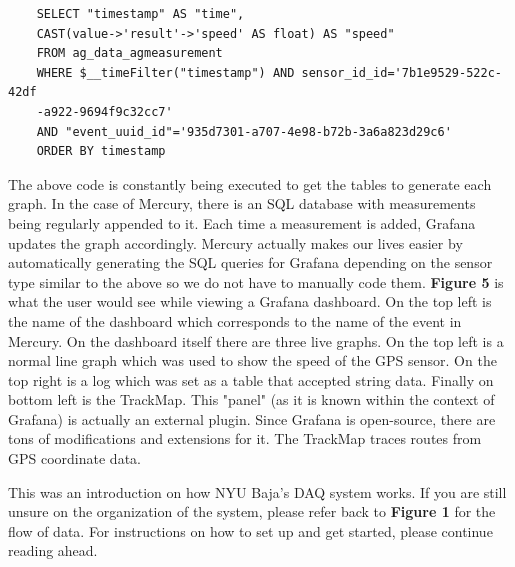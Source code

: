 \documentclass[12pt, letterpaper]{article}
\begin{document}
\begin{verbatim}
    SELECT "timestamp" AS "time",
    CAST(value->'result'->'speed' AS float) AS "speed"
    FROM ag_data_agmeasurement
    WHERE $__timeFilter("timestamp") AND sensor_id_id='7b1e9529-522c-42df
    -a922-9694f9c32cc7'
    AND "event_uuid_id"='935d7301-a707-4e98-b72b-3a6a823d29c6'
    ORDER BY timestamp
\end{verbatim}
	
	 The above code is constantly being executed to get the tables to generate each graph. In the case of Mercury, there is an SQL database with measurements being regularly appended to it. Each time a measurement is added, Grafana updates the graph accordingly. Mercury actually makes our lives easier by automatically generating the SQL queries for Grafana depending on the sensor type similar to the above so we do not have to manually code them. \textbf{Figure 5} is what the user would see while viewing a Grafana dashboard. On the top left is the name of the dashboard which corresponds to the name of the event in Mercury. On the dashboard itself there are three live graphs. On the top left is a normal line graph which was used to show the speed of the GPS sensor. On the top right is a log which was set as a table that accepted string data. Finally on bottom left is the TrackMap. This "panel" (as it is known within the context of Grafana) is actually an external plugin. Since Grafana is open-source, there are tons of modifications and extensions for it. The TrackMap traces routes from GPS coordinate data.
	 
\par This was an introduction on how NYU Baja's DAQ system works. If you are still unsure on the organization of the system, please refer back to \textbf{Figure 1} for the flow of data. For instructions on how to set up and get started, please continue reading ahead.
	

	
\end{document}
